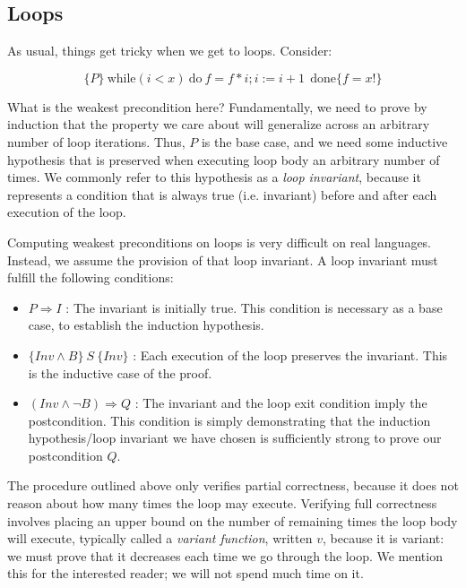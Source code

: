 \documentclass[11pt]{article}
\begin{document}
\subsection{Loops}

As usual, things get tricky when we get to loops.  Consider:

\begin{center}
\[
\{P\}~\mbox{while} (i<x)~ \mbox{do}~f=f*i; i:=i+1~~ \mbox{done} \{f=x!\}
\]
\end{center}

What is the weakest precondition here?  Fundamentally, we
need to prove by induction that the property we care about will generalize
across an arbitrary number of loop iterations.  Thus, $P$ is the base case,
and we need some inductive hypothesis that is preserved when executing loop body
an arbitrary number of times. We commonly refer to this hypothesis as a \textit{loop
  invariant}, because it represents a condition that is always true
(i.e. invariant) before and after each execution of the loop.

Computing weakest preconditions on loops is very difficult on real languages.
Instead, we assume the provision of that loop invariant.  A loop invariant must
fulfill the following conditions:

\begin{itemize}
\item $P \Rightarrow I$ : The invariant is initially true.  This condition is
  necessary as a base case, to establish the induction hypothesis.

\item $\{ Inv \land B \} ~S~ \{Inv\}$ : Each execution of the loop preserves the
  invariant.  This is the inductive case of the proof.

\item $(Inv \land \lnot B) \Rightarrow Q$ : The invariant and the loop exit
  condition imply the postcondition.  This condition is simply demonstrating
  that the induction hypothesis/loop invariant we have chosen is sufficiently
  strong to prove our postcondition $Q$.
\end{itemize}

The procedure outlined above only verifies partial correctness, because it does
not reason about how many times the loop may execute.  Verifying full
correctness involves placing an upper bound on the number of remaining times the
loop body will execute, typically called a \textit{variant function}, written
$v$, because it is variant: we must prove that it decreases each time we go
through the loop.  We mention this for the interested reader; we will not spend
much time on it.
\end{document}

